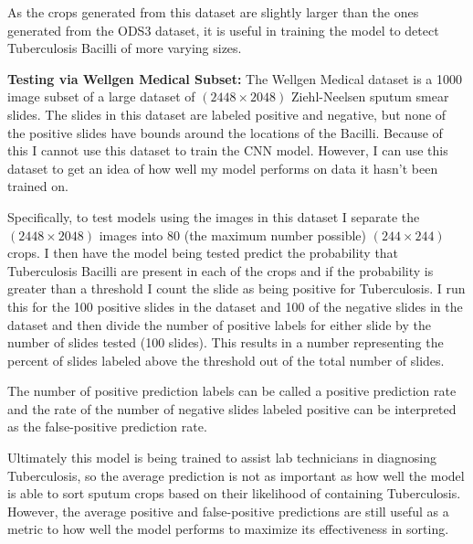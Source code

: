 \documentclass{article}
\begin{document}
As the crops generated from this dataset are slightly larger than the ones generated from the ODS3 dataset, it is useful
in training the model to detect Tuberculosis Bacilli of more varying sizes.


\textbf{Testing via Wellgen Medical Subset:}
The Wellgen Medical dataset\cite{lin2024tbdata} is a 1000 image subset of a large dataset of $(2448 \times 2048)$ Ziehl-Neelsen sputum smear slides. 
The slides in this dataset are labeled positive and negative, but none of the positive slides have bounds around the locations of the
Bacilli. Because of this I cannot use this dataset to train the CNN model. However, I can use this dataset to get an idea of how well my
model performs on data it hasn't been trained on.

Specifically, to test models using the images in this dataset I separate the $(2448 \times 2048)$ images into 80 (the maximum number possible)
$(244 \times 244)$ crops. I then have the model being tested predict the probability that Tuberculosis Bacilli are present in each of the crops and
if the probability is greater than a threshold I count the slide as being positive for Tuberculosis. I run this for the 100 positive slides
in the dataset and 100 of the negative slides in the dataset and then divide the number of positive labels for either slide by the number of
slides tested (100 slides). This results in a number representing the percent of slides labeled above the threshold out of the total number of slides.

The number of positive prediction labels can be called a positive prediction rate and the rate of the number of negative slides labeled positive can be 
interpreted as the false-positive prediction rate.


Ultimately this model is being trained to assist lab technicians in diagnosing Tuberculosis, so the average prediction is not as important as how
well the model is able to sort sputum crops based on their likelihood of containing Tuberculosis. However, the average positive and false-positive
predictions are still useful as a metric to how well the model performs to maximize its effectiveness in sorting.

\end{document}
